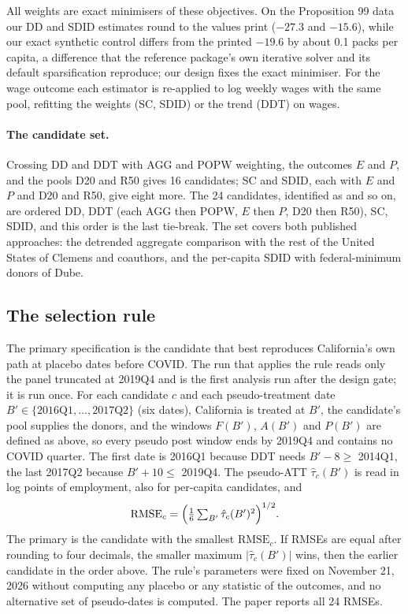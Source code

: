 All weights are exact minimisers of these objectives. On the Proposition 99 data our DD and SDID
estimates round to the values \citet[Table~1]{arkhangelsky2021synthetic} print ($-27.3$ and
$-15.6$), while our exact synthetic control differs from the printed $-19.6$ by about 0.1 packs per
capita, a difference that the reference package's own iterative solver and its default
sparsification reproduce; our design fixes the exact minimiser. For the wage outcome each estimator
is re-applied to log weekly wages with the same pool, refitting the weights (SC, SDID) or the trend
(DDT) on wages.

\paragraph{The candidate set.} Crossing DD and DDT with AGG and POPW weighting, the outcomes $E$
and $P$, and the pools D20 and R50 gives 16 candidates; SC and SDID, each with $E$ and $P$ and D20
and R50, give eight more. The 24 candidates, identified as  and so on, are
ordered DD, DDT (each AGG then POPW, $E$ then $P$, D20 then R50), SC, SDID, and this order is the
last tie-break. The set covers both published approaches: the detrended aggregate comparison with
the rest of the United States of Clemens and coauthors, and the per-capita SDID with federal-minimum
donors of Dube.

\subsection{The selection rule}
\label{sec:select}

The primary specification is the candidate that best reproduces California's own path at placebo
dates before COVID. The run that applies the rule reads only the panel truncated at 2019Q4 and is
the first analysis run after the design gate; it is run once. For each candidate $c$ and each
pseudo-treatment date $B' \in \{\text{2016Q1}, \dots, \text{2017Q2}\}$ (six dates), California is
treated at $B'$, the candidate's pool supplies the donors, and the windows $F(B')$, $A(B')$ and
$P(B')$ are defined as above, so every pseudo post window ends by 2019Q4 and contains no COVID
quarter. The first date is 2016Q1 because DDT needs $B'-8 \geq$ 2014Q1, the last 2017Q2 because
$B'+10 \leq$ 2019Q4. The pseudo-ATT $\hat\tau_c(B')$ is read in log points of employment, also for
per-capita candidates, and
\begin{equation}
\mathrm{RMSE}_c = \Bigl(\tfrac{1}{6}\textstyle\sum_{B'}\hat\tau_c(B')^2\Bigr)^{1/2}.
\end{equation}
The primary is the candidate with the smallest $\mathrm{RMSE}_c$. If RMSEs are equal after rounding
to four decimals, the smaller maximum $|\hat\tau_c(B')|$ wins, then the earlier candidate in the
order above. The rule's parameters were fixed on November 21, 2026 without computing any placebo
or any statistic of the outcomes, and no alternative set of pseudo-dates is computed. The paper
reports all 24 RMSEs.

